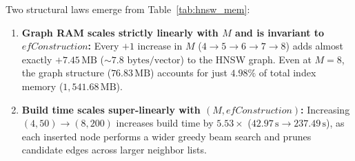 \documentclass[11pt]{article}
\begin{document}
\begin{table}[H]
\centering
{}
\caption{HNSW index build time and exact memory breakdown across $(M, \mathit{efConstruction})$ configurations on 1M vectors.}
\label{tab:hnsw_mem}
\end{table}

Two structural laws emerge from Table~\ref{tab:hnsw_mem}:
\begin{enumerate}
    \item \textbf{Graph RAM scales strictly linearly with $M$ and is invariant to $\mathit{efConstruction}$:} Every $+1$ increase in $M$ ($4 \to 5 \to 6 \to 7 \to 8$) adds almost exactly $+7.45\,\text{MB}$ ($\sim 7.8\text{ bytes/vector}$) to the HNSW graph. Even at $M=8$, the graph structure ($76.83\,\text{MB}$) accounts for just $4.98\%$ of total index memory ($1{,}541.68\,\text{MB}$).
    \item \textbf{Build time scales super-linearly with $(M, \mathit{efConstruction})$:} Increasing $(4, 50) \to (8, 200)$ increases build time by $5.53\times$ ($42.97\,\text{s} \to 237.49\,\text{s}$), as each inserted node performs a wider greedy beam search and prunes candidate edges across larger neighbor lists.
\end{enumerate}
\end{document}
